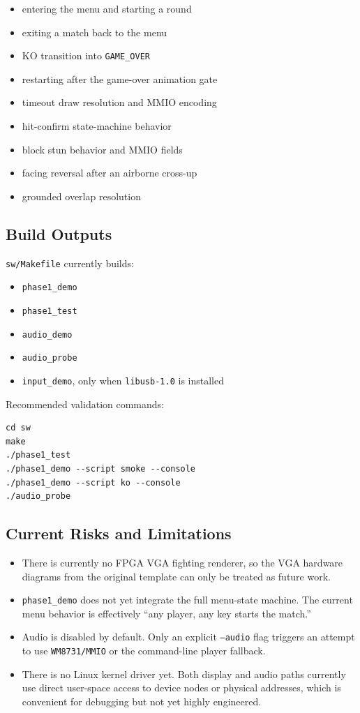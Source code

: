 \documentclass[12pt,a4paper]{article}
\begin{document}
\begin{itemize}
  \item entering the menu and starting a round
  \item exiting a match back to the menu
  \item KO transition into \texttt{GAME\_OVER}
  \item restarting after the game-over animation gate
  \item timeout draw resolution and MMIO encoding
  \item hit-confirm state-machine behavior
  \item block stun behavior and MMIO fields
  \item facing reversal after an airborne cross-up
  \item grounded overlap resolution
\end{itemize}

\subsection{Build Outputs}

\texttt{sw/Makefile} currently builds:

\begin{itemize}
  \item \texttt{phase1\_demo}
  \item \texttt{phase1\_test}
  \item \texttt{audio\_demo}
  \item \texttt{audio\_probe}
  \item \texttt{input\_demo}, only when \texttt{libusb-1.0} is installed
\end{itemize}

Recommended validation commands:

\begin{lstlisting}[style=fighterstyle]
cd sw
make
./phase1_test
./phase1_demo --script smoke --console
./phase1_demo --script ko --console
./audio_probe
\end{lstlisting}

\subsection{Current Risks and Limitations}

\begin{itemize}
  \item There is currently no FPGA VGA fighting renderer, so the VGA hardware diagrams from the original template can only be treated as future work.
  \item \texttt{phase1\_demo} does not yet integrate the full menu-state machine. The current menu behavior is effectively ``any player, any key starts the match.''
  \item Audio is disabled by default. Only an explicit \texttt{--audio} flag triggers an attempt to use \texttt{WM8731/MMIO} or the command-line player fallback.
  \item There is no Linux kernel driver yet. Both display and audio paths currently use direct user-space access to device nodes or physical addresses, which is convenient for debugging but not yet highly engineered.
\end{itemize}
\end{document}
